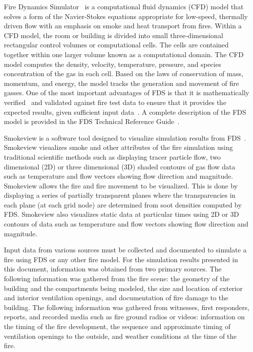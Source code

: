 \documentclass[12pt,oneside]{book}
\begin{document}
Fire Dynamics Simulator~\cite{FDS_Users_Guide} is a computational fluid dynamics (CFD) model that solves a form of the Navier-Stokes equations appropriate for low-speed, thermally driven flow with an emphasis on smoke and heat transport from fires. Within a CFD model, the room or building is divided into small three-dimensional rectangular control volumes or computational cells. The cells are contained together within one larger volume known as a computational domain. The CFD model computes the density, velocity, temperature, pressure, and species concentration of the gas in each cell. Based on the laws of conservation of mass, momentum, and energy, the model tracks the generation and movement of fire gasses. One of the most important advantages of FDS is that it is mathematically verified~\cite{FDS_Verification_Guide} and validated against fire test data to ensure that it provides the expected results, given sufficient input data~\cite{FDS_Validation_Guide}. A complete description of the FDS model is provided in the FDS Technical Reference Guide~\cite{FDS_Math_Guide}.

Smokeview is a software tool designed to visualize simulation results from FDS~\cite{Smokeview_Users_Guide}. Smokeview visualizes smoke and other attributes of the fire simulation using traditional scientific methods such as displaying tracer particle flow, two dimensional (2D) or three dimensional (3D) shaded contours of gas flow data such as temperature and flow vectors showing flow direction and magnitude. Smokeview allows the fire and fire movement to be visualized. This is done by displaying a series of partially transparent planes where the transparencies in each plane (at each grid node) are determined from soot densities computed by FDS. Smokeview also visualizes static data at particular times using 2D or 3D contours of data such as temperature and flow vectors showing flow direction and magnitude.

Input data from various sources must be collected and documented to simulate a fire using FDS or any other fire model. For the simulation results presented in this document, information was obtained from two primary sources. The following information was gathered from the fire scene: the geometry of the building and the compartments being modeled, the size and location of exterior and interior ventilation openings, and documentation of fire damage to the building. The following information was gathered from witnesses, first responders, reports, and recorded media such as fire ground radios or videos: information on the timing of the fire development, the sequence and approximate timing of ventilation openings to the outside, and weather conditions at the time of the fire. 
\end{document}
